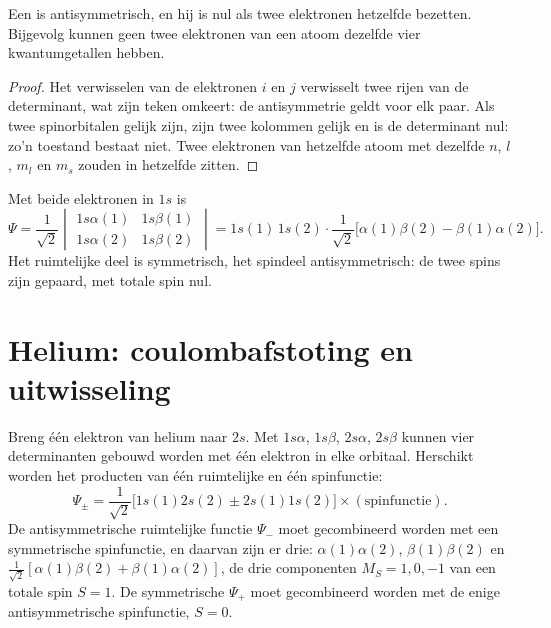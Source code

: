 \begin{theorem}\label{thm:b3:many-electron-atoms:pauli}
Een  is antisymmetrisch, en hij is nul als twee
elektronen hetzelfde  bezetten. Bijgevolg kunnen geen twee
elektronen van een atoom dezelfde vier kwantumgetallen hebben.
\end{theorem}

\begin{proof}
Het verwisselen van de elektronen $i$ en $j$ verwisselt twee rijen van de
determinant, wat zijn teken omkeert: de antisymmetrie geldt voor elk paar.
Als twee
spinorbitalen gelijk zijn, zijn twee kolommen gelijk en is de determinant
nul: zo'n toestand bestaat niet. Twee elektronen van hetzelfde atoom met
dezelfde $n$, $l$,
$m_l$ en $m_s$ zouden in hetzelfde  zitten.
\end{proof}

\begin{example}\label{ex:b3:many-electron-atoms:helium-ground}
Met beide elektronen in $1s$ is
\[
\Psi = \frac{1}{\sqrt2}\begin{vmatrix}1s\alpha(1) & 1s\beta(1)\\ 1s\alpha(2) &
1s\beta(2)\end{vmatrix} = 1s(1)\,1s(2)\cdot\frac{1}{\sqrt2}\big[\alpha(1)\beta(2)
- \beta(1)\alpha(2)\big].
\]
Het ruimtelijke deel is symmetrisch, het spindeel antisymmetrisch: de twee
spins zijn gepaard, met totale spin nul.
\end{example}

\section{Helium: coulombafstoting en uitwisseling}

Breng één elektron van helium naar $2s$. Met $1s\alpha$, $1s\beta$,
$2s\alpha$, $2s\beta$ kunnen vier determinanten gebouwd worden met één
elektron in elke orbitaal.
Herschikt worden het producten van één ruimtelijke en één spinfunctie:
\[
\Psi_\pm = \frac{1}{\sqrt2}\big[1s(1)2s(2) \pm 2s(1)1s(2)\big]\times(\text{spinfunctie}).
\]
De antisymmetrische ruimtelijke functie $\Psi_-$ moet gecombineerd worden
met een symmetrische spinfunctie, en daarvan zijn er drie: $\alpha(1)\alpha(2)$,
$\beta(1)\beta(2)$ en $\frac{1}{\sqrt2}[\alpha(1)\beta(2) + \beta(1)\alpha(2)]$, de
drie componenten $M_S = 1, 0, -1$ van een totale spin $S = 1$. De
symmetrische $\Psi_+$ moet gecombineerd worden met de enige
antisymmetrische spinfunctie, $S = 0$.

